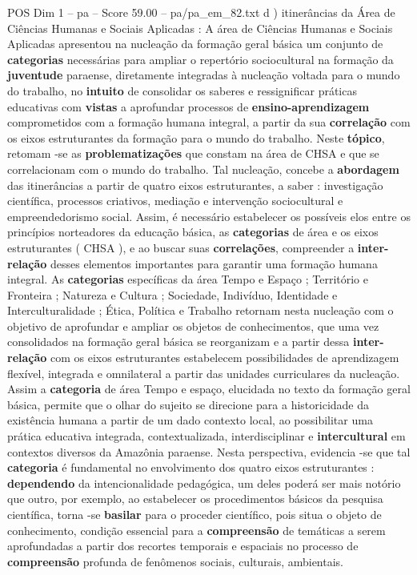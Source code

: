 \begin{textsample}{POS Dim 1 – pa – Score 59.00 – pa/pa\_em\_82.txt}  \label{ex:f1_pos_036}
d ) itinerâncias da Área de Ciências Humanas e Sociais Aplicadas : A área de Ciências Humanas e Sociais Aplicadas apresentou na nucleação da formação geral básica um conjunto de \textbf{categorias} necessárias para ampliar o repertório sociocultural na formação da \textbf{juventude} paraense, diretamente integradas à nucleação voltada para o mundo do trabalho, no \textbf{intuito} de consolidar os saberes e ressignificar práticas educativas com \textbf{vistas} a aprofundar processos de \textbf{ensino-aprendizagem} comprometidos com a formação humana integral, a partir da sua \textbf{correlação} com os eixos estruturantes da formação para o mundo do trabalho.
Neste \textbf{tópico}, retomam -se as \textbf{problematizações} que constam na área de CHSA e que se correlacionam com o mundo do trabalho.
Tal nucleação, concebe a \textbf{abordagem} das itinerâncias a partir de quatro eixos estruturantes, a saber : investigação científica, processos criativos, mediação e intervenção sociocultural e empreendedorismo social.
Assim, é necessário estabelecer os possíveis elos entre os princípios norteadores da educação básica, as \textbf{categorias} de área e os eixos estruturantes ( CHSA ), e ao buscar suas \textbf{correlações}, compreender a \textbf{inter-relação} desses elementos importantes para garantir uma formação humana integral.
As \textbf{categorias} específicas da área Tempo e Espaço ; Território e Fronteira ; Natureza e Cultura ; Sociedade, Indivíduo, Identidade e Interculturalidade ; Ética, Política e Trabalho retornam nesta nucleação com o objetivo de aprofundar e ampliar os objetos de conhecimentos, que uma vez consolidados na formação geral básica se reorganizam e a partir dessa \textbf{inter-relação} com os eixos estruturantes estabelecem possibilidades de aprendizagem flexível, integrada e omnilateral a partir das unidades curriculares da nucleação.
Assim a \textbf{categoria} de área Tempo e espaço, elucidada no texto da formação geral básica, permite que o olhar do sujeito se direcione para a historicidade da existência humana a partir de um dado contexto local, ao possibilitar uma prática educativa integrada, contextualizada, interdisciplinar e \textbf{intercultural} em contextos diversos da Amazônia paraense.
Nesta perspectiva, evidencia -se que tal \textbf{categoria} é fundamental no envolvimento dos quatro eixos estruturantes : \textbf{dependendo} da intencionalidade pedagógica, um deles poderá ser mais notório que outro, por exemplo, ao estabelecer os procedimentos básicos da pesquisa científica, torna -se \textbf{basilar} para o proceder científico, pois situa o objeto de conhecimento, condição essencial para a \textbf{compreensão} de temáticas a serem aprofundadas a partir dos recortes temporais e espaciais no processo de \textbf{compreensão} profunda de fenômenos sociais, culturais, ambientais.

\end{textsample}
